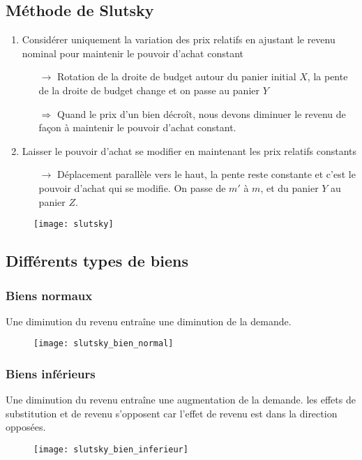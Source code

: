 \subsection{Méthode de Slutsky}

\begin{enumerate}
\item Considérer uniquement la variation des prix relatifs en ajustant le revenu nominal pour maintenir le pouvoir d'achat constant
	\begin{itemize}
	\item[$\rightarrow$] Rotation de la droite de budget autour du panier initial $X$, la pente de la droite de budget change et on passe au panier $Y$
	\item[$\Rightarrow$] Quand le prix d'un bien décroît, nous devons diminuer le revenu de façon à maintenir le pouvoir d'achat constant.
	\end{itemize}
\item Laisser le pouvoir d'achat se modifier en maintenant les prix relatifs constants
	\begin{itemize}
	\item[$\rightarrow$] Déplacement parallèle vers le haut, la pente reste constante et c'est le pouvoir d'achat qui se modifie. On passe de $m'$ à $m$, et du panier $Y$ au panier $Z$.
	\end{itemize}
\end{enumerate}

\begin{figure}[H]
	\centering
	\texttt{[image: slutsky]}
\end{figure}


\subsection{Différents types de biens}

\subsubsection{Biens normaux}
Une diminution du revenu entraîne une diminution de la demande.
\begin{figure}[H]
	\centering
	\texttt{[image: slutsky\_bien\_normal]}
\end{figure}

\newpage
\subsubsection{Biens inférieurs}
Une diminution du revenu entraîne une augmentation de la demande. les effets de substitution et de revenu s'opposent car l'effet de revenu est dans la direction opposées.
\begin{figure}[H]
	\centering
	\texttt{[image: slutsky\_bien\_inferieur]}
\end{figure}

